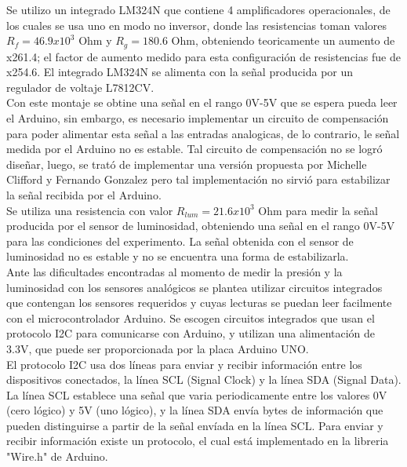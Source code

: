 \documentclass[11pt]{article}
\begin{document}
\noindent Se utilizo un integrado LM324N que contiene 4 amplificadores operacionales, de los cuales se usa uno en modo no inversor, donde las resistencias toman valores $R_f=46.9 x 10^3$ Ohm y $R_g=180.6$ Ohm, obteniendo teoricamente un aumento de x261.4; el factor de aumento medido para esta configuraci\'on de resistencias fue de x254.6. El integrado LM324N se alimenta con la señal producida por un regulador de voltaje L7812CV.\\

\noindent Con este montaje se obtine una señal en el rango 0V-5V que se espera pueda leer el Arduino, sin embargo, es necesario implementar un circuito de compensaci\'on para poder alimentar esta señal a las entradas analogicas, de lo contrario, le señal medida por el Arduino no es estable. Tal circuito de compensaci\'on no se logr\'o diseñar, luego, se trat\'o de implementar una versi\'on propuesta por Michelle Clifford y Fernando Gonzalez pero tal implementaci\'on no sirvi\'o para estabilizar la señal recibida por el Arduino.\\

\noindent Se utiliza una resistencia con valor $R_{lum}=21.6 x 10^{3}$ Ohm para medir la señal producida por el sensor de luminosidad, obteniendo una señal en el rango 0V-5V para las condiciones del experimento. La señal obtenida con el sensor de luminosidad no es estable y no se encuentra una forma de estabilizarla.\\

\noindent Ante las dificultades encontradas al momento de medir la presi\'on y la luminosidad con los sensores anal\'ogicos se plantea utilizar circuitos integrados que contengan los sensores requeridos y cuyas lecturas se puedan leer facilmente con el microcontrolador Arduino. Se escogen circuitos integrados que usan el protocolo I2C para comunicarse con Arduino, y utilizan una alimentaci\'on de 3.3V, que puede ser proporcionada por la placa Arduino UNO.\\

\noindent El protocolo I2C usa dos l\'ineas para enviar y recibir informaci\'on entre los dispositivos conectados, la l\'inea SCL (Signal Clock) y la l\'inea SDA (Signal Data). La l\'inea SCL establece una señal que varia periodicamente entre los valores 0V (cero l\'ogico) y 5V (uno l\'ogico), y la l\'inea SDA env\'ia bytes de informaci\'on que pueden distinguirse a partir de la señal env\'iada en la l\'inea SCL. Para enviar y recibir informaci\'on existe un protocolo, el cual est\'a implementado en la libreria "Wire.h" de Arduino.
\end{document}
